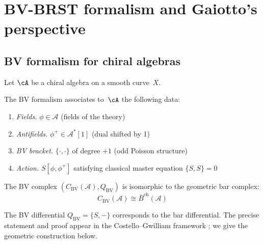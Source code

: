 \chapter{BV-BRST formalism and Gaiotto's perspective}
\label{ch:bv-brst}

\label{rem:programme-bv}

\section{BV formalism for chiral algebras}

Let $\cA$ be a chiral algebra on a smooth curve~$X$.

\begin{definition}
The BV formalism associates to~$\cA$ the following data:
\begin{enumerate}
\item \emph{Fields.} $\phi \in \mathcal{A}$ (fields of the theory)
\item \emph{Antifields.} $\phi^+ \in \mathcal{A}^*[1]$ (dual shifted by 1)
\item \emph{BV bracket.} $\{\cdot, \cdot\}$ of degree $+1$ (odd Poisson structure)
\item \emph{Action.} $S[\phi, \phi^+]$ satisfying classical master equation
$\{S, S\} = 0$
\end{enumerate}
\end{definition}

\begin{theorem}[BV complex = geometric bar complex; \ClaimStatusProvedElsewhere]
\label{thm:bv-bar-geometric}
The BV complex $(C_{\text{BV}}(\mathcal{A}), Q_{\text{BV}})$ is isomorphic to
the geometric bar complex:
\[C_{\text{BV}}(\mathcal{A}) \cong \bar{B}^{\text{ch}}(\mathcal{A})\]

The BV differential $Q_{\text{BV}} = \{S, -\}$ corresponds to the bar differential.
The precise statement and proof appear in the Costello--Gwilliam framework \cite{CG17}; we give the geometric construction below.
\end{theorem}

